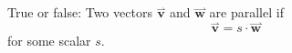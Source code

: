 \documentclass{ximera}
\author{Bart Snapp}
\begin{document}
\begin{exercise}
  True or false: Two vectors $\overset{\boldsymbol{\rightharpoonup}}{\mathbf{v}}$ and $\overset{\boldsymbol{\rightharpoonup}}{\mathbf{w}}$ are parallel if 
  \[
  \overset{\boldsymbol{\rightharpoonup}}{\mathbf{v}} = s\cdot \overset{\boldsymbol{\rightharpoonup}}{\mathbf{w}}\
  \]
  for some scalar $s$.
  \begin{multipleChoice}
  \end{multipleChoice}
\end{exercise}
\end{document}
